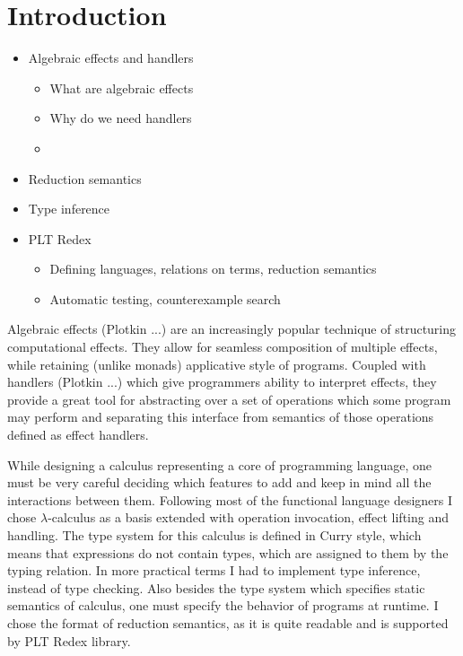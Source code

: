 \documentclass[inz, english, shortabstract]{iithesis}
\author         {Maciej Buszka}
\begin{document}

\chapter{Introduction}
\begin{itemize}
  \item Algebraic effects and handlers
  \begin{itemize}
    \item What are algebraic effects
    \item Why do we need handlers
    \item 
  \end{itemize}
  
  \item Reduction semantics
  
  \item Type inference
  
  \item PLT Redex
  \begin{itemize}
    \item Defining languages, relations on terms, reduction semantics
    \item Automatic testing, counterexample search
  \end{itemize}
\end{itemize}

Algebraic effects (Plotkin ...) are an increasingly %
popular technique of structuring computational effects. They allow for seamless
composition of multiple effects, while retaining (unlike monads) applicative style
of programs. Coupled with handlers (Plotkin ...) which give programmers ability to
interpret effects, they provide a great tool for abstracting over a set of operations
which some program may perform and separating this interface from semantics of those
operations defined as effect handlers.

While designing a calculus representing a core of programming language, one must be very
careful deciding which features to add and keep in mind all the interactions between them. Following
most of the functional language designers I chose $\lambda$-calculus as a basis extended with operation
invocation, effect lifting and handling. The type system for this calculus is defined in Curry style,
which means that expressions do not contain types, which are assigned to them by the typing relation.
In more practical terms I had to implement type inference, instead of type checking. Also besides the
type system which specifies static semantics of calculus, one must specify the behavior of programs
at runtime. I chose the format of reduction semantics, as it is quite readable and is supported by
PLT Redex library. 


\end{document}
